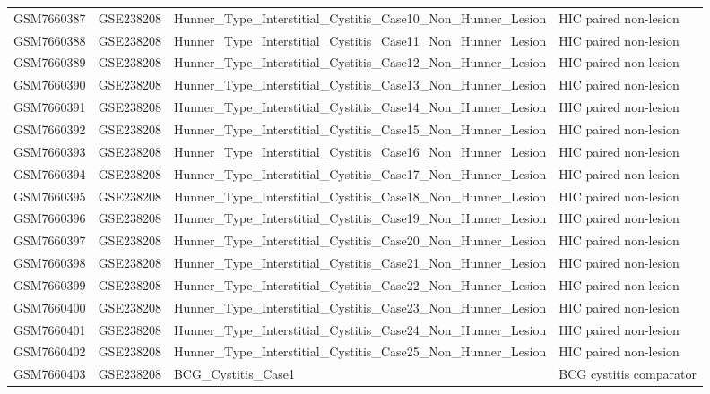 \begin{longtable}{llp{}l}
GSM7660387 & GSE238208 & Hunner\_Type\_Interstitial\_Cystitis\_Case10\_Non\_Hunner\_Lesion & HIC paired non-lesion \\
GSM7660388 & GSE238208 & Hunner\_Type\_Interstitial\_Cystitis\_Case11\_Non\_Hunner\_Lesion & HIC paired non-lesion \\
GSM7660389 & GSE238208 & Hunner\_Type\_Interstitial\_Cystitis\_Case12\_Non\_Hunner\_Lesion & HIC paired non-lesion \\
GSM7660390 & GSE238208 & Hunner\_Type\_Interstitial\_Cystitis\_Case13\_Non\_Hunner\_Lesion & HIC paired non-lesion \\
GSM7660391 & GSE238208 & Hunner\_Type\_Interstitial\_Cystitis\_Case14\_Non\_Hunner\_Lesion & HIC paired non-lesion \\
GSM7660392 & GSE238208 & Hunner\_Type\_Interstitial\_Cystitis\_Case15\_Non\_Hunner\_Lesion & HIC paired non-lesion \\
GSM7660393 & GSE238208 & Hunner\_Type\_Interstitial\_Cystitis\_Case16\_Non\_Hunner\_Lesion & HIC paired non-lesion \\
GSM7660394 & GSE238208 & Hunner\_Type\_Interstitial\_Cystitis\_Case17\_Non\_Hunner\_Lesion & HIC paired non-lesion \\
GSM7660395 & GSE238208 & Hunner\_Type\_Interstitial\_Cystitis\_Case18\_Non\_Hunner\_Lesion & HIC paired non-lesion \\
GSM7660396 & GSE238208 & Hunner\_Type\_Interstitial\_Cystitis\_Case19\_Non\_Hunner\_Lesion & HIC paired non-lesion \\
GSM7660397 & GSE238208 & Hunner\_Type\_Interstitial\_Cystitis\_Case20\_Non\_Hunner\_Lesion & HIC paired non-lesion \\
GSM7660398 & GSE238208 & Hunner\_Type\_Interstitial\_Cystitis\_Case21\_Non\_Hunner\_Lesion & HIC paired non-lesion \\
GSM7660399 & GSE238208 & Hunner\_Type\_Interstitial\_Cystitis\_Case22\_Non\_Hunner\_Lesion & HIC paired non-lesion \\
GSM7660400 & GSE238208 & Hunner\_Type\_Interstitial\_Cystitis\_Case23\_Non\_Hunner\_Lesion & HIC paired non-lesion \\
GSM7660401 & GSE238208 & Hunner\_Type\_Interstitial\_Cystitis\_Case24\_Non\_Hunner\_Lesion & HIC paired non-lesion \\
GSM7660402 & GSE238208 & Hunner\_Type\_Interstitial\_Cystitis\_Case25\_Non\_Hunner\_Lesion & HIC paired non-lesion \\
GSM7660403 & GSE238208 & BCG\_Cystitis\_Case1 & BCG cystitis comparator \\

\end{longtable}
